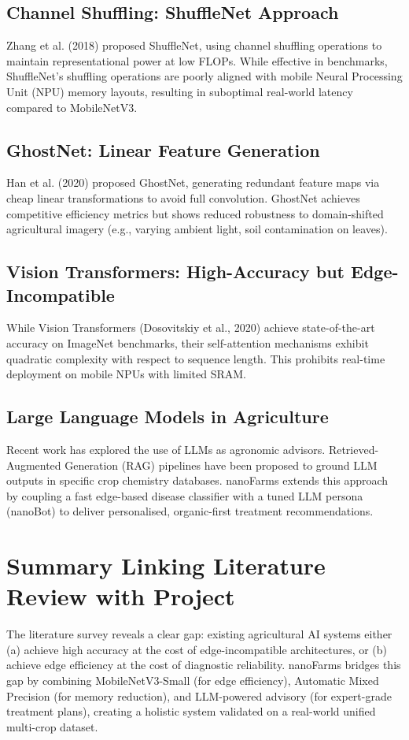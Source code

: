 \documentclass[12pt,oneside]{report}
\begin{document}
\subsection{Channel Shuffling: ShuffleNet Approach}
Zhang et al. (2018) proposed ShuffleNet, using channel shuffling operations to maintain representational power at low FLOPs. While effective in benchmarks, ShuffleNet's shuffling operations are poorly aligned with mobile Neural Processing Unit (NPU) memory layouts, resulting in suboptimal real-world latency compared to MobileNetV3.

\subsection{GhostNet: Linear Feature Generation}
Han et al. (2020) proposed GhostNet, generating redundant feature maps via cheap linear transformations to avoid full convolution. GhostNet achieves competitive efficiency metrics but shows reduced robustness to domain-shifted agricultural imagery (e.g., varying ambient light, soil contamination on leaves).

\subsection{Vision Transformers: High-Accuracy but Edge-Incompatible}
While Vision Transformers (Dosovitskiy et al., 2020) achieve state-of-the-art accuracy on ImageNet benchmarks, their self-attention mechanisms exhibit quadratic complexity with respect to sequence length. This prohibits real-time deployment on mobile NPUs with limited SRAM.

\subsection{Large Language Models in Agriculture}
Recent work has explored the use of LLMs as agronomic advisors. Retrieved-Augmented Generation (RAG) pipelines have been proposed to ground LLM outputs in specific crop chemistry databases. nanoFarms extends this approach by coupling a fast edge-based disease classifier with a tuned LLM persona (nanoBot) to deliver personalised, organic-first treatment recommendations.

\section{Summary Linking Literature Review with Project}
The literature survey reveals a clear gap: existing agricultural AI systems either (a) achieve high accuracy at the cost of edge-incompatible architectures, or (b) achieve edge efficiency at the cost of diagnostic reliability. nanoFarms bridges this gap by combining MobileNetV3-Small (for edge efficiency), Automatic Mixed Precision (for memory reduction), and LLM-powered advisory (for expert-grade treatment plans), creating a holistic system validated on a real-world unified multi-crop dataset.
\end{document}
